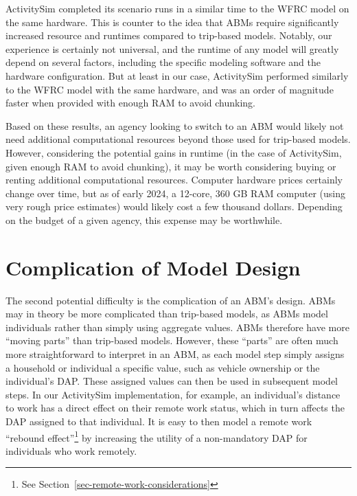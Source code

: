 \documentclass[fancy, twoside, mastersfancy, ms]{byuthesis}
\begin{document}
ActivitySim completed its scenario runs in a similar time to the WFRC
model on the same hardware. This is counter to the idea that ABMs
require significantly increased resource and runtimes compared to
trip-based models. Notably, our experience is certainly not universal,
and the runtime of any model will greatly depend on several factors,
including the specific modeling software and the hardware configuration.
But at least in our case, ActivitySim performed similarly to the WFRC
model with the same hardware, and was an order of magnitude faster when
provided with enough RAM to avoid chunking.

Based on these results, an agency looking to switch to an ABM would
likely not need additional computational resources beyond those used for
trip-based models. However, considering the potential gains in runtime
(in the case of ActivitySim, given enough RAM to avoid chunking), it may
be worth considering buying or renting additional computational
resources. Computer hardware prices certainly change over time, but as
of early 2024, a 12-core, 360 GB RAM computer (using very rough price
estimates) would likely cost a few thousand dollars. Depending on the
budget of a given agency, this expense may be worthwhile.

\section{Complication of Model
Design}\label{complication-of-model-design}

The second potential difficulty is the complication of an ABM's design.
ABMs may in theory be more complicated than trip-based models, as ABMs
model individuals rather than simply using aggregate values. ABMs
therefore have more ``moving parts'' than trip-based models. However,
these ``parts'' are often much more straightforward to interpret in an
ABM, as each model step simply assigns a household or individual a
specific value, such as vehicle ownership or the individual's DAP. These
assigned values can then be used in subsequent model steps. In our
ActivitySim implementation, for example, an individual's distance to
work has a direct effect on their remote work status, which in turn
affects the DAP assigned to that individual. It is easy to then model a
remote work ``rebound effect''\footnote{See
  Section~\ref{sec-remote-work-considerations}} by increasing the
utility of a non-mandatory DAP for individuals who work remotely.
\end{document}
